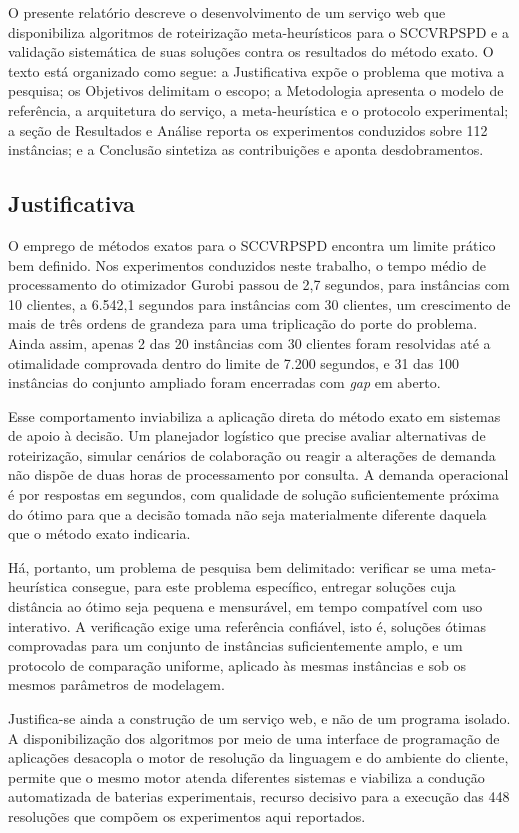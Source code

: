 \documentclass[a4paper,12pt]{article}
\begin{document}
O presente relatório descreve o desenvolvimento de um serviço web que disponibiliza algoritmos de roteirização meta-heurísticos para o SCCVRPSPD e a validação sistemática de suas soluções contra os resultados do método exato. O texto está organizado como segue: a Justificativa expõe o problema que motiva a pesquisa; os Objetivos delimitam o escopo; a Metodologia apresenta o modelo de referência, a arquitetura do serviço, a meta-heurística e o protocolo experimental; a seção de Resultados e Análise reporta os experimentos conduzidos sobre 112 instâncias; e a Conclusão sintetiza as contribuições e aponta desdobramentos.

\subsection{Justificativa}
O emprego de métodos exatos para o SCCVRPSPD encontra um limite prático bem definido. Nos experimentos conduzidos neste trabalho, o tempo médio de processamento do otimizador Gurobi passou de 2,7 segundos, para instâncias com 10 clientes, a 6.542,1 segundos para instâncias com 30 clientes, um crescimento de mais de três ordens de grandeza para uma triplicação do porte do problema. Ainda assim, apenas 2 das 20 instâncias com 30 clientes foram resolvidas até a otimalidade comprovada dentro do limite de 7.200 segundos, e 31 das 100 instâncias do conjunto ampliado foram encerradas com \textit{gap} em aberto.

Esse comportamento inviabiliza a aplicação direta do método exato em sistemas de apoio à decisão. Um planejador logístico que precise avaliar alternativas de roteirização, simular cenários de colaboração ou reagir a alterações de demanda não dispõe de duas horas de processamento por consulta. A demanda operacional é por respostas em segundos, com qualidade de solução suficientemente próxima do ótimo para que a decisão tomada não seja materialmente diferente daquela que o método exato indicaria.

Há, portanto, um problema de pesquisa bem delimitado: verificar se uma meta-heurística consegue, para este problema específico, entregar soluções cuja distância ao ótimo seja pequena e mensurável, em tempo compatível com uso interativo. A verificação exige uma referência confiável, isto é, soluções ótimas comprovadas para um conjunto de instâncias suficientemente amplo, e um protocolo de comparação uniforme, aplicado às mesmas instâncias e sob os mesmos parâmetros de modelagem.

Justifica-se ainda a construção de um serviço web, e não de um programa isolado. A disponibilização dos algoritmos por meio de uma interface de programação de aplicações desacopla o motor de resolução da linguagem e do ambiente do cliente, permite que o mesmo motor atenda diferentes sistemas e viabiliza a condução automatizada de baterias experimentais, recurso decisivo para a execução das 448 resoluções que compõem os experimentos aqui reportados.
\end{document}
